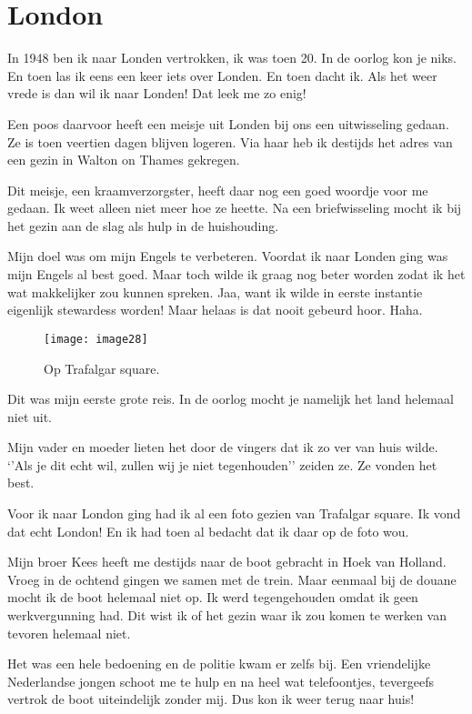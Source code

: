 \chapter*{London}

In 1948 ben ik naar Londen vertrokken, ik was toen 20. In de oorlog kon je niks. En toen las ik eens een keer iets over Londen. En toen dacht ik. Als het weer vrede is dan wil ik naar Londen! Dat leek me zo enig! 

Een poos daarvoor heeft een meisje uit Londen bij ons een uitwisseling gedaan. Ze is toen veertien dagen blijven logeren. Via haar heb ik destijds het adres van een gezin in Walton on Thames gekregen. 

Dit meisje, een kraamverzorgster, heeft daar nog een goed woordje voor me gedaan. Ik weet alleen niet meer hoe ze heette. Na een briefwisseling mocht ik bij het gezin aan de slag als hulp in de huishouding. 

Mijn doel was om mijn Engels te verbeteren. Voordat ik naar Londen ging was mijn Engels al best goed. Maar toch wilde ik graag nog beter worden zodat ik het wat makkelijker zou kunnen spreken. Jaa, want ik wilde in eerste instantie eigenlijk stewardess worden! Maar helaas is dat nooit gebeurd hoor. Haha. 

\begin{figure}[h]
    \texttt{[image: image28]}
    \caption{Op Trafalgar square.}
\end{figure}

Dit was mijn eerste grote reis. In de oorlog mocht je namelijk het land helemaal niet uit.

Mijn vader en moeder lieten het door de vingers dat ik zo ver van huis wilde. ‘’Als je dit echt wil, zullen wij je niet tegenhouden’’ zeiden ze. Ze vonden het best. 

Voor ik naar London ging had ik al een foto gezien van Trafalgar square. Ik vond dat echt London! En ik had toen al bedacht dat ik daar op de foto wou.

Mijn broer Kees heeft me destijds naar de boot gebracht in Hoek van Holland. Vroeg in de ochtend gingen we samen met de trein. Maar eenmaal bij de douane mocht ik de boot helemaal niet op. Ik werd tegengehouden omdat ik geen werkvergunning had. Dit wist ik of het gezin waar ik zou komen te werken van tevoren helemaal niet. 

Het was een hele bedoening en de politie kwam er zelfs bij. Een vriendelijke Nederlandse jongen schoot me te hulp en na heel wat telefoontjes, tevergeefs vertrok de boot uiteindelijk zonder mij. Dus kon ik weer terug naar huis!

